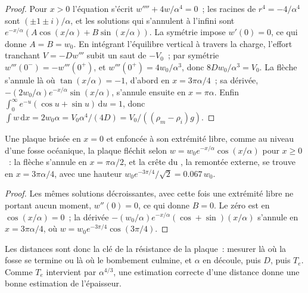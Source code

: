 \begin{proof}
Pour $x > 0$ l'équation s'écrit $w'''' + 4w/\alpha^4 = 0$~; les racines de
$r^4 = -4/\alpha^4$ sont $(\pm1 \pm i)/\alpha$, et les solutions qui s'annulent à
l'infini sont $e^{-x/\alpha}(A\cos(x/\alpha) + B\sin(x/\alpha))$. La symétrie impose
$w'(0) = 0$, ce qui donne $A = B = w_0$. En intégrant l'équilibre vertical à travers
la charge, l'effort tranchant $V = -Dw'''$ subit un saut de $-V_0$~; par symétrie
$w'''(0^-) = -w'''(0^+)$, et $w'''(0^+) = 4w_0/\alpha^3$, donc $8Dw_0/\alpha^3 =
V_0$. La flèche s'annule là où $\tan(x/\alpha) =
-1$, d'abord en $x = 3\pi\alpha/4$~; sa dérivée,
$-(2w_0/\alpha)e^{-x/\alpha}\sin(x/\alpha)$, s'annule ensuite en $x = \pi\alpha$.
Enfin $\int_0^\infty e^{-u}(\cos u + \sin u)\,\mathrm du = 1$, donc
$\int w\,\mathrm dx = 2w_0\alpha = V_0\alpha^4/(4D) = V_0/((\rho_m - \rho_i)g)$.
\end{proof}

\begin{proposition}\label{prop:b3:gravity-geodesy:broken}
Une plaque brisée en $x = 0$ et enfoncée à son extrémité libre, comme au niveau d'une fosse
océanique, la plaque fléchit selon $w = w_0e^{-x/\alpha}\cos(x/\alpha)$ pour $x \ge 0$~: la
flèche s'annule en $x = \pi\alpha/2$, et la crête du , la
remontée externe, se trouve en $x = 3\pi\alpha/4$, avec une hauteur $w_0e^{-3\pi/4}/\sqrt2 =
\num{0.067}\,w_0$.
\end{proposition}

\begin{proof}
Les mêmes solutions décroissantes, avec cette fois une extrémité libre ne portant aucun moment,
$w''(0) = 0$, ce qui donne $B = 0$. Le zéro est en $\cos(x/\alpha) = 0$~; la
dérivée $-(w_0/\alpha)e^{-x/\alpha}(\cos + \sin)(x/\alpha)$ s'annule en
$x = 3\pi\alpha/4$, où $w = w_0e^{-3\pi/4}\cos(3\pi/4)$.
\end{proof}

Les distances sont donc la clé de la résistance de la plaque~: mesurer là où la fosse
se termine ou là où le bombement culmine, et $\alpha$ en découle, puis $D$, puis $T_e$.
Comme $T_e$ intervient par $\alpha^{4/3}$, une estimation correcte d'une distance donne une bonne
estimation de l'épaisseur.

